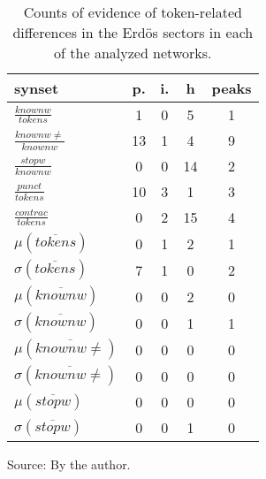 \begin{table}[h!]
\begin{center}
\caption{Counts of evidence of token-related differences in the Erd\"os sectors in each of the analyzed networks.}
	\def\arraystretch{1.5}
\begin{tabular}{l || c | c | c || c}\hline
{\bf synset} & {\bf p.} & {\bf i.} & {\bf h} & {\bf peaks} \\\hline\hline
$\frac{knownw}{tokens}$ & 1  & 0  & 5  & 1 \\
$\frac{knownw \neq}{knownw}$ & 13  & 1  & 4  & 9 \\
$\frac{stopw}{knownw}$ & 0  & 0  & 14  & 2 \\
$\frac{punct}{tokens}$ & 10  & 3  & 1  & 3 \\
$\frac{contrac}{tokens}$ & 0  & 2  & 15  & 4 \\\hline
$\mu(\overline{tokens})$ & 0  & 1  & 2  & 1 \\
$\sigma(\overline{tokens})$ & 7  & 1  & 0  & 2 \\\hline
$\mu(\overline{knownw})$ & 0  & 0  & 2  & 0 \\
$\sigma(\overline{knownw})$ & 0  & 0  & 1  & 1 \\\hline
$\mu(\overline{knownw \neq})$ & 0  & 0  & 0  & 0 \\
$\sigma(\overline{knownw \neq})$ & 0  & 0  & 0  & 0 \\\hline
$\mu(\overline{stopw})$ & 0  & 0  & 0  & 0 \\
$\sigma(\overline{stopw})$ & 0  & 0  & 1  & 0 \\\hline
\end{tabular}
\begin{flushleft}\footnotesize
		Source: By the author.\
\end{flushleft}
\end{center}
\end{table}
